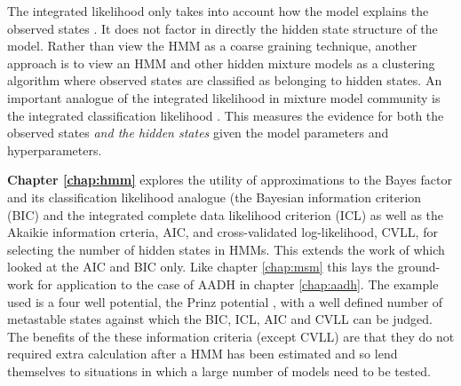 The integrated likelihood only takes into account how the model explains the observed states \cite{biernackiAssessingMixtureModel2000a,mclachlanFiniteMixtureModels2000}. It does not factor in directly the hidden state structure of the model. Rather than view the HMM as a coarse graining technique, another approach is to view an HMM and other hidden mixture models as a clustering algorithm \cite{mclachlanFiniteMixtureModels2000} where observed states are classified as belonging to hidden states. An important analogue of the integrated likelihood in mixture model community is the integrated classification likelihood \cite{mclachlanFiniteMixtureModels2000}. This measures the evidence for  both the observed states \emph{and the hidden states} given the model parameters and hyperparameters. 

\textbf{Chapter \ref{chap:hmm}} explores the utility of approximations to the Bayes factor and its classification likelihood analogue (the Bayesian information criterion (BIC) \cite{schwarzEstimatingDimensionModel1978a} and the integrated complete data likelihood criterion (ICL) \cite{biernackiAssessingMixtureModel2000a} as well as the Akaikie information crteria, AIC, \cite{akaikeInformationTheoryExtension1998} and cross-validated log-likelihood, CVLL, \cite{celeuxSelectingHiddenMarkov2008} for selecting the number of hidden states in HMMs. This extends the work of \cite{mcgibbonStatisticalModelSelection2014a} which looked at the AIC and BIC only. Like chapter \ref{chap:msm} this lays the ground-work for application to the case of AADH in chapter \ref{chap:aadh}. The example used is a four well potential, the Prinz potential \cite{prinzMarkovModelsMolecular2011}, with a well defined number of metastable states against which the BIC, ICL, AIC and CVLL can be judged. The benefits of the these information criteria (except CVLL) are that they do not required extra calculation after a HMM has been estimated and so lend themselves to situations in which a large number of models need to be tested. 

